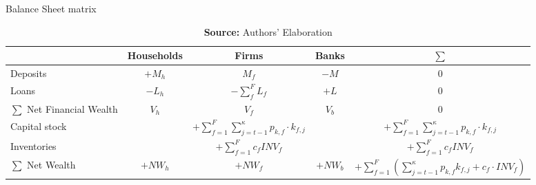\begin{table*}
\centering
\caption{Balance Sheet matrix}
\label{Ch_super_balance_sheet}
\begin{tabular}{lcccc}
\hline
\hline
                          & Households      & Firms        & Banks  &    $\sum$ \\ \hline

Deposits& $+M_{h}$ &$M_{f}$ & $-M$ & 0\\
Loans& $-L_{h}$ &$-\sum_{f}^{F} L_f$& $+L$ & 0\\\hline
$\sum$ Net Financial Wealth &$V_{h}$&$V_f$&$V_b$& $0$\\\hline
Capital stock & &$+\sum_{f=1}^{F} \sum_{j=t-1}^{\kappa}p_{k,f}\cdot k_{f,j}$&  & $+\sum_{f=1}^{F} \sum_{j=t-1}^{\kappa}p_{k,f}\cdot k_{f,j}$ \\
Inventories & &$+\sum_{f=1}^{F}c_{f}INV_{f}$& & $+\sum_{f=1}^{F}c_{f}INV_{f}$\\\hline
$\sum$ Net Wealth &$+NW_{h}$&$+NW_f$&$+NW_b$& $+\sum_{f=1}^{F}(\sum_{j=t-1}^{\kappa}p_{k,f}k_{f,j} + c_{f}\cdot INV_{f})$\\
\hline
\hline
\end{tabular}%
\caption*{\textbf{Source:} Authors' Elaboration}
\end{table*}
